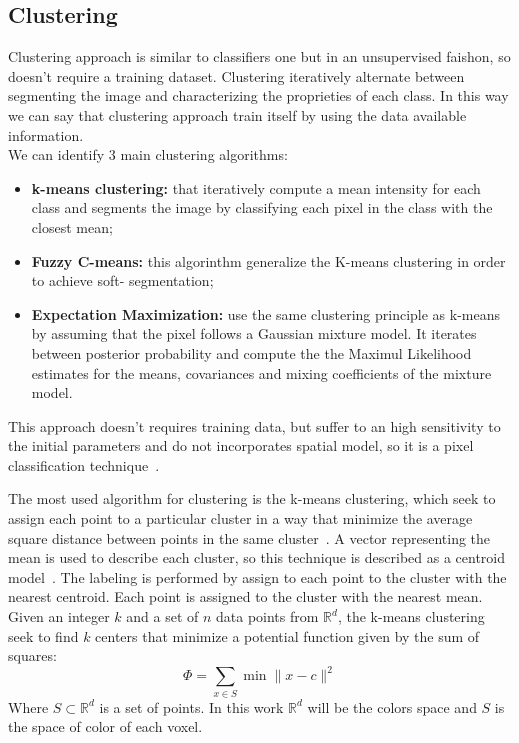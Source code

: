 \documentclass{standalone}
\begin{document}
	\subsection{Clustering}

		Clustering approach is similar to classifiers one but in an unsupervised faishon, so doesn't require a training dataset.
		Clustering iteratively alternate between segmenting the image and characterizing the  proprieties of each class. In this way we can say that clustering approach train itself by using the data available information.\\
		We can identify 3 main clustering algorithms: 
		\begin{itemize}
	
			\item \textbf{k-means clustering: } that iteratively compute a mean intensity for each class and segments the image by classifying each pixel in the class with the closest mean;
	
			\item \textbf{Fuzzy C-means: } this algorinthm generalize the K-means clustering in order to achieve soft- segmentation;
		
			\item \textbf{Expectation Maximization:} use the same clustering principle as k-means by assuming that the pixel follows a Gaussian mixture model. It iterates between posterior probability and compute the the Maximul Likelihood estimates for the means, covariances and mixing coefficients of the mixture model. 
	
		\end{itemize}

		This approach doesn't requires training data, but suffer to an high sensitivity to the initial parameters and do not incorporates spatial model, so it is a pixel classification technique~\cite{ART:Pham}. 
		
		
		The most used algorithm for clustering is the k-means clustering, which seek to assign each point to a particular cluster in a way that minimize the average square distance between points in the same cluster~\cite{Arthur2007}. A vector representing the mean is used to describe each cluster, so this technique is described as a centroid model~\cite{ART:Morisette}. The labeling is performed by assign to each point to the cluster with the nearest centroid.
		Each point is assigned to the cluster with the nearest mean.\\
		
		Given an integer $k$ and a set of $n$ data points from $\mathbb{R}^d$, the k-means clustering seek to find $k$ centers that minimize a potential function given by the sum of squares: 
		\begin{equation}
			\Phi = \sum_{x\in S}\min\| x - c\|^2
		\end{equation} 
		Where $S\subset \mathbb R^d$ is a set of points. In this work $\mathbb{R}^d$ will be the colors space and $S$ is the space of color of each voxel.
		
\end{document}

